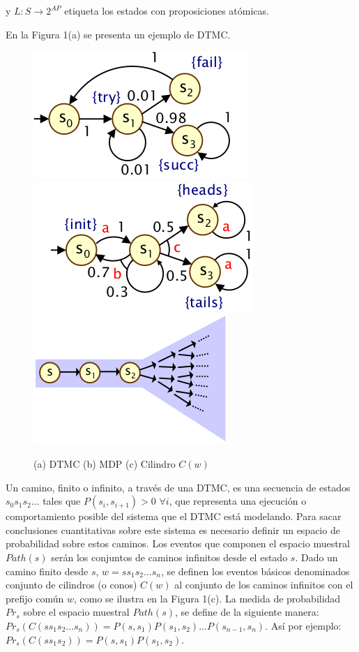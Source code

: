 \documentclass[11pt]{article}
\begin{document}
y $L: S \rightarrow 2^{AP}$ etiqueta los estados con proposiciones at\'omicas.

En la Figura 1(a) se presenta un ejemplo de DTMC.

\begin{figure}[h]
	\includegraphics[scale=0.6]{DTMC.png} \includegraphics[scale=0.6]{MDP.png} \includegraphics[scale=0.6]{cone.png}
	\centering
	\caption{(a) DTMC \hspace{2cm} (b) MDP \hspace{2,1cm} (c) Cilindro $C(w)$}
\end{figure}

Un camino, finito o infinito, a trav\'es de una DTMC, es una secuencia de estados $s_0s_1s_2...$ tales que $P(s_i, s_{i+1}) > 0$ $\forall i$, que representa una ejecuci\'on o comportamiento posible del sistema que el DTMC est\'a modelando. Para sacar conclusiones cuantitativas sobre este sistema es necesario definir un espacio de probabilidad sobre estos caminos. Los eventos que componen el espacio muestral $Path(s)$ ser\'an los conjuntos de caminos infinitos desde el estado $s$.  Dado un camino finito desde $s$, $w = ss_1s_2...s_n$, se definen los eventos b\'asicos denominados conjunto de cilindros (o conos) $C(w)$ al conjunto de los caminos infinitos con el prefijo com\'un $w$, como se ilustra en la Figura 1(c). La medida de probabilidad $Pr_s$ sobre el espacio muestral $Path(s)$, se define de la siguiente manera: $Pr_s(C(ss_1s_2...s_n)) = P(s,s_1)P(s_1,s_2)...P(s_{n-1}, s_n)$. As\'i por ejemplo: $Pr_s(C(ss_1s_2)) = P(s,s_1)P(s_1,s_2)$. \\
\end{document}

